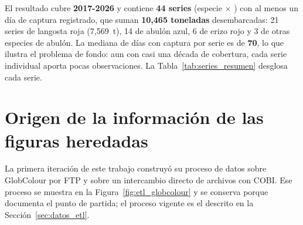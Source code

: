 El resultado cubre \textbf{2017-2026} y contiene \textbf{44 series} (especie $\times$ \ue{}) con
al menos un día de captura registrado, que suman \textbf{10{,}465 toneladas} desembarcadas: 21
series de langosta roja (7{,}569~t), 14 de abulón azul, 6 de erizo rojo y 3 de otras especies de
abulón. La mediana de días con captura por serie es de \textbf{70}, lo que ilustra el problema
de fondo: aun con casi una década de cobertura, cada serie individual aporta pocas
observaciones. La Tabla~\ref{tab:series_resumen} desglosa cada serie.



\section{Origen de la información de las figuras heredadas}

La primera iteración de este trabajo construyó su proceso de datos sobre GlobColour por FTP y
sobre un intercambio directo de archivos con COBI. Ese proceso se muestra en la
Figura~\ref{fig:etl_globcolour} y se conserva porque documenta el punto de partida; el proceso
vigente es el descrito en la Sección~\ref{sec:datos_etl}.


